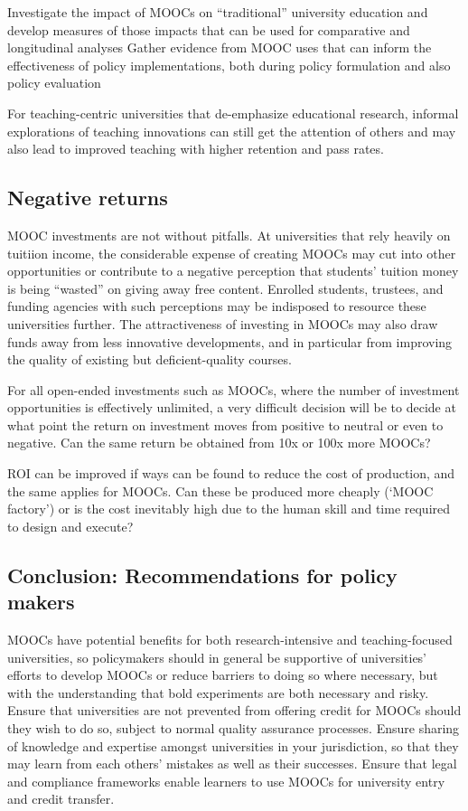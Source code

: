 Investigate the impact of MOOCs on
``traditional'' university education and develop measures of those impacts
that can be used for comparative and longitudinal analyses Gather
evidence from MOOC uses that can inform the effectiveness of policy
implementations, both during policy formulation and also policy
evaluation


For teaching-centric universities that de-emphasize  educational research,
informal explorations of teaching innovations can still get the attention of
others and may also lead to improved
teaching with higher retention and pass rates.

\subsection{Negative returns}

MOOC investments are not without pitfalls.
At universities that rely heavily on tuitiion income, the considerable
expense of creating MOOCs may cut into other opportunities or
contribute to a negative perception that students' tuition money is
being ``wasted'' on giving away free content.
Enrolled students, trustees, and funding agencies with such perceptions
may be indisposed to resource these universities further.
The attractiveness of investing in MOOCs may also draw funds away from less
innovative developments, and in particular from improving the quality of
existing but deficient-quality courses.
 
 
For all open-ended investments such as MOOCs, where the number of
investment opportunities is effectively unlimited, a very difficult
decision will be to decide at what point the return on investment moves
from positive to neutral or even to negative.  Can the same return be
obtained from 10x or 100x more MOOCs?
 
ROI can be improved if ways can be found to reduce the cost of
production, and the same applies for MOOCs.  Can these be produced more
cheaply (‘MOOC factory’) or is the cost inevitably high due to the human
skill and time required to design and execute?
 
\subsection{Conclusion: Recommendations for policy makers }


MOOCs have potential benefits for both research-intensive and
teaching-focused universities, so policymakers should in general be
supportive of universities' efforts to develop MOOCs or reduce barriers
to doing so where necessary, but with the understanding that bold
experiments are both necessary and risky.
Ensure that universities are not prevented from offering credit for
MOOCs should they wish to do so, subject to normal quality assurance
processes.
Ensure sharing of knowledge and expertise amongst universities in your
jurisdiction, so that they may learn from each others' mistakes as well
as their successes.
Ensure that legal and compliance frameworks enable learners to use MOOCs
for university entry and credit transfer.
 
